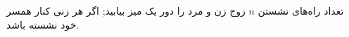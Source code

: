 \p
تعداد راه‌های نشستن $n$ 
زوج زن و مرد را دور یک میز بیابید; اگر
هر زنی کنار همسر خود نشسته باشد.
